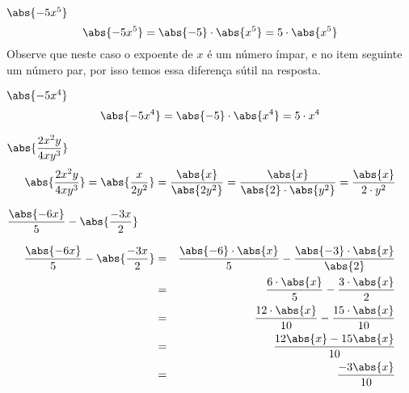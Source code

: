  \begin{exem}
  $\abs{-5x^5}$
\begin{equation}
\abs{-5x^5}= \abs{-5}\cdot \abs{x^5}= 5 \cdot \abs{x^5}
\end{equation}
 Observe que neste caso o expoente de $x$ é um número ímpar, e no item seguinte um número par, por isso temos essa diferença sútil na resposta.
 \end{exem}
 
 \begin{exem}
  $\abs{-5x^4}$
\begin{equation}
\abs{-5x^4}= \abs{-5}\cdot \abs{x^4}= 5 \cdot x^4
\end{equation}
 \end{exem}
 
 \begin{exem}
  $\abs{\dfrac{2x^2y}{4xy^3}}$
\begin{equation}
\abs{\dfrac{2x^2y}{4xy^3}} = \abs{\dfrac{x}{2y^2}}= \dfrac{\abs{x}}{\abs{2y^2}}= \dfrac{\abs{x}}{\abs{2} \cdot \abs{y^2}}= \frac{\abs{x}}{2 \cdot y^2}
\end{equation}
 \end{exem}
 
 \begin{exem}
  $\dfrac{\abs{-6x}}{5} - \abs{\dfrac{-3x}{2}}$

 \begin{eqnarray*}
  \dfrac{\abs{-6x}}{5} - \abs{\dfrac{-3x}{2}} &=&
 \dfrac{\abs{-6}\cdot \abs{x}}{5} - \dfrac{\abs{-3} \cdot \abs{x}}{\abs{2}} \\
 &=& \dfrac{6 \cdot \abs{x}}{5} - \dfrac{ 3 \cdot \abs{x}}{2} \\
 &=& \dfrac{12 \cdot \abs{x}}{10} - \dfrac{15 \cdot \abs{x}}{10} \\
 &=& \dfrac{12\abs{x} - 15\abs{x}}{10} \\
 &=& \dfrac{-3\abs{x}}{10}
 \end{eqnarray*}

\end{exem}

